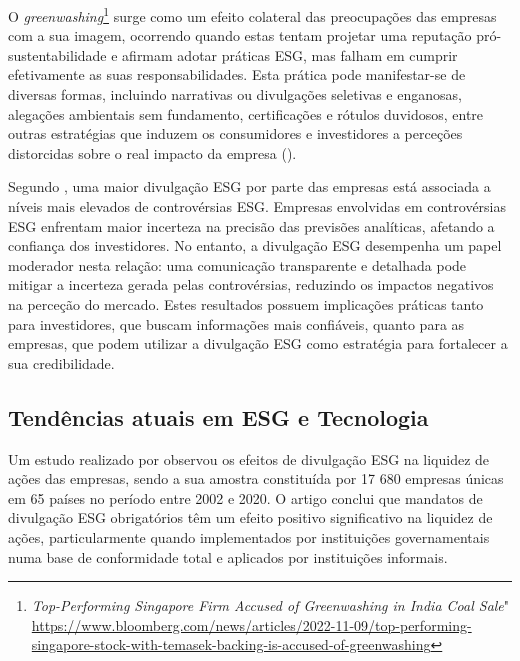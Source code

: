 O \textit{greenwashing}\footnote{\textit{Top-Performing Singapore Firm Accused of Greenwashing in India Coal Sale}" \url{https://www.bloomberg.com/news/articles/2022-11-09/top-performing-singapore-stock-with-temasek-backing-is-accused-of-greenwashing}} surge como um efeito colateral das preocupações das empresas com a sua imagem, ocorrendo quando estas tentam projetar uma reputação pró-sustentabilidade e afirmam adotar práticas \gls{ESG}, mas falham em cumprir efetivamente as suas responsabilidades. Esta prática pode manifestar-se de diversas formas, incluindo narrativas ou divulgações seletivas e enganosas, alegações ambientais sem fundamento, certificações e rótulos duvidosos, entre outras estratégias que induzem os consumidores e investidores a perceções distorcidas sobre o real impacto da empresa (\cite{Rau2024}).

Segundo \cite{Schiemann2022}, uma maior divulgação \gls{ESG} por parte das empresas está associada a níveis mais elevados de controvérsias \gls{ESG}. Empresas envolvidas em controvérsias \gls{ESG} enfrentam maior incerteza na precisão das previsões analíticas, afetando a confiança dos investidores. No entanto, a divulgação \gls{ESG} desempenha um papel moderador nesta relação: uma comunicação transparente e detalhada pode mitigar a incerteza gerada pelas controvérsias, reduzindo os impactos negativos na perceção do mercado. Estes resultados possuem implicações práticas tanto para investidores, que buscam informações mais confiáveis, quanto para as empresas, que podem utilizar a divulgação \gls{ESG} como estratégia para fortalecer a sua credibilidade.


\subsection{Tendências atuais em \gls{ESG} e Tecnologia}
\label{subsec: TAESG}

Um estudo realizado por \cite{Krueger2024} observou os efeitos de divulgação \gls{ESG} na liquidez de ações das empresas, sendo a sua amostra constituída por 17 680 empresas únicas em 65 países no período entre 2002 e 2020. O artigo conclui que mandatos de divulgação \gls{ESG} obrigatórios têm um efeito positivo significativo na liquidez de ações, particularmente quando implementados por instituições governamentais numa base de conformidade total e aplicados por instituições informais.

